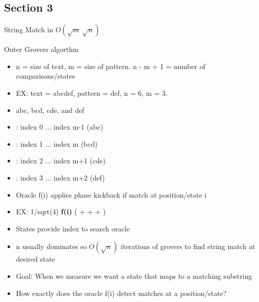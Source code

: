 \documentclass{beamer}
\begin{document}
\subsection{Section 3}
\begin{frame}{String Match in \(O(\sqrt{m}\ \sqrt{n} )\)}
  \begin{block}{Outer Grovers algorthm}
    \begin{itemize}
      \item n = size of text, m = size of pattern. n - m + 1 = number of comparisons/states
      \item EX: text = abcdef, pattern = def, n = 6, m = 3.
      \item abc, bcd, cde, and def
      \item {}: index 0 ... index m-1 (abc)
      \item {}: index 1 ... index m   (bcd)
      \item {}: index 2 ... index m+1 (cde)
      \item {}: index 3 ... index m+2 (def)
      \item Oracle f(i) applies phase kickback if match at position/state i
      \item EX: 1/sqrt(4) \textbf{f(i)} ( +  +  + )
      \item States provide index to search oracle
      \item n usually dominates so \(O(\sqrt{n})\) iterations of grovers to find string match at desired state
      \item Goal: When we measure we want a state that maps to a matching substring
      \item How exactly does the oracle f(i) detect matches at a position/state?
    \end{itemize}
  \end{block}
\end{frame}
\end{document}
